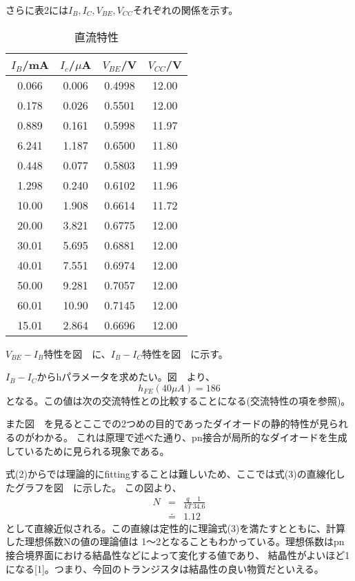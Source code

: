\documentclass[11pt,a4j,titlepage]{jsarticle}
\begin{document}
 さらに表2には$I_B,I_C,V_{BE},V_{CC}$それぞれの関係を示す。
 \newpage
 \begin{table}[htb]
  \begin{center}
    \caption{直流特性}
    \begin{tabular}{cccc} \toprule
$I_B$/mA & $I_c$/$\mu$A & $V_{BE}$/V & $V_{CC}$/V \\ \midrule
0.066	&	0.006	&	0.4998	&	12.00	\\
0.178	&	0.026	&	0.5501	&	12.00	\\
0.889	&	0.161	&	0.5998	&	11.97	\\
6.241	&	1.187	&	0.6500	&	11.80	\\
0.448	&	0.077	&	0.5803	&	11.99	\\
1.298	&	0.240	&	0.6102	&	11.96	\\
10.00	&	1.908	&	0.6614	&	11.72	\\
20.00	&	3.821	&	0.6775	&	12.00	\\
30.01	&	5.695	&	0.6881	&	12.00	\\
40.01	&	7.551	&	0.6974	&	12.00	\\
50.00	&	9.281	&	0.7057	&	12.00	\\
60.01	&	10.90	&	0.7145	&	12.00	\\
15.01	&	2.864	&	0.6696	&	12.00	\\ \bottomrule
    \end{tabular}
    \label{tab:price}
  \end{center}
\end{table}
 
 $V_{BE}-I_B$特性を図\ \ に、$I_B-I_C$特性を図\ \ に示す。
 
 $I_B-I_C$からhパラメータを求めたい。図\ \ より、
 \begin{equation}
  h_{FE}(40\mu A) = 186 \nonumber
 \end{equation}
 となる。この値は次の交流特性との比較することになる(交流特性の項を参照)。
 
 また図\ \ を見るとここでの2つめの目的であったダイオードの静的特性が見られるのがわかる。
 これは原理で述べた通り、pn接合が局所的なダイオードを生成しているために見られる現象である。
 
 式(2)からでは理論的にfittingすることは難しいため、ここでは式(3)の直線化したグラフを図\ \ に示した。
 この図より、
 \begin{eqnarray}
  N &=& \frac{q}{kT}\frac{1}{34.6} \nonumber \\
    &\doteq& 1.12 \nonumber
 \end{eqnarray}
 として直線近似される。この直線は定性的に理論式(3)を満たすとともに、計算した理想係数Nの値の理論値は
 1～2となることもわかっている。理想係数はpn接合境界面における結晶性などによって変化する値であり、
 結晶性がよいほど1になる[1]。つまり、今回のトランジスタは結晶性の良い物質だといえる。
\end{document}
